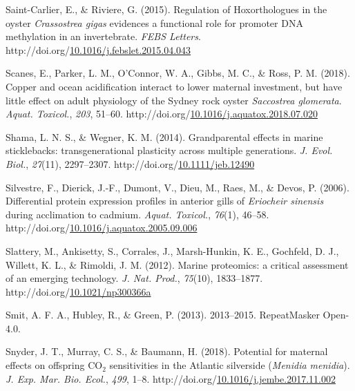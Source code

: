 \documentclass [11pt, proquest] {uwthesis}[2015/03/03]
\newlength{\cslhangindent}
\newenvironment{CSLReferences}%
{\setlength{\parindent}{0pt}%
\everypar{\setlength{\hangindent}{\cslhangindent}}\ignorespaces}%
{\par}
\begin{document}
\begin{CSLReferences}{1}{0}
\leavevmode\hypertarget{ref-Saint-Carlier2015}{}%
Saint-Carlier, E., \& Riviere, G. (2015). {Regulation of Hoxorthologues in the oyster \emph{Crassostrea gigas} evidences a functional role for promoter DNA methylation in an invertebrate}. \emph{FEBS Letters}. http://doi.org/\href{https://doi.org/10.1016/j.febslet.2015.04.043}{10.1016/j.febslet.2015.04.043}

\leavevmode\hypertarget{ref-Scanes2018}{}%
Scanes, E., Parker, L. M., O'Connor, W. A., Gibbs, M. C., \& Ross, P. M. (2018). {Copper and ocean acidification interact to lower maternal investment, but have little effect on adult physiology of the Sydney rock oyster \emph{Saccostrea glomerata}}. \emph{Aquat. Toxicol.}, \emph{203}, 51--60. http://doi.org/\href{https://doi.org/10.1016/j.aquatox.2018.07.020}{10.1016/j.aquatox.2018.07.020}

\leavevmode\hypertarget{ref-Shama2014}{}%
Shama, L. N. S., \& Wegner, K. M. (2014). {Grandparental effects in marine sticklebacks: transgenerational plasticity across multiple generations}. \emph{J. Evol. Biol.}, \emph{27}(11), 2297--2307. http://doi.org/\href{https://doi.org/10.1111/jeb.12490}{10.1111/jeb.12490}

\leavevmode\hypertarget{ref-Silvestre2006}{}%
Silvestre, F., Dierick, J.-F., Dumont, V., Dieu, M., Raes, M., \& Devos, P. (2006). {Differential protein expression profiles in anterior gills of \emph{Eriocheir sinensis} during acclimation to cadmium}. \emph{Aquat. Toxicol.}, \emph{76}(1), 46--58. http://doi.org/\href{https://doi.org/10.1016/j.aquatox.2005.09.006}{10.1016/j.aquatox.2005.09.006}

\leavevmode\hypertarget{ref-Slattery2012}{}%
Slattery, M., Ankisetty, S., Corrales, J., Marsh-Hunkin, K. E., Gochfeld, D. J., Willett, K. L., \& Rimoldi, J. M. (2012). {Marine proteomics: a critical assessment of an emerging technology}. \emph{J. Nat. Prod.}, \emph{75}(10), 1833--1877. http://doi.org/\href{https://doi.org/10.1021/np300366a}{10.1021/np300366a}

\leavevmode\hypertarget{ref-Smit2013}{}%
Smit, A. F. A., Hubley, R., \& Green, P. (2013). {2013--2015. RepeatMasker Open-4.0}.

\leavevmode\hypertarget{ref-Snyder2018}{}%
Snyder, J. T., Murray, C. S., \& Baumann, H. (2018). {Potential for maternal effects on offspring {CO\(_2\)} sensitivities in the Atlantic silverside (\emph{Menidia menidia})}. \emph{J. Exp. Mar. Bio. Ecol.}, \emph{499}, 1--8. http://doi.org/\href{https://doi.org/10.1016/j.jembe.2017.11.002}{10.1016/j.jembe.2017.11.002}


\end{CSLReferences}
\end{document}
